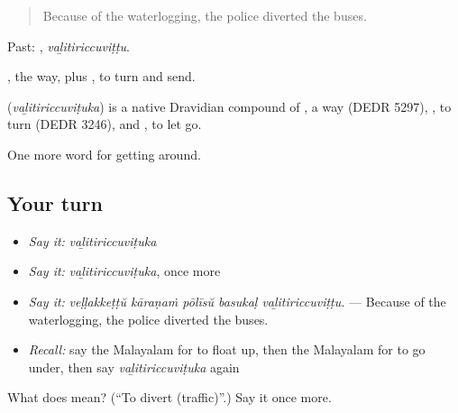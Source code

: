 \begin{quote}
Because of the waterlogging, the police diverted the buses.
\end{quote}

Past: , \emph{vaḻitiriccuviṭṭu}.

, the way, plus , to turn and send.

\begin{cousinweb}
\textbf{} (\emph{vaḻitiriccuviṭuka}) is a native Dravidian compound of , a way (DEDR 5297), , to turn (DEDR 3246), and , to let go.
\end{cousinweb}

\begin{grammarlens}[title={What you've built}]
One more word for getting around.
\end{grammarlens}

\subsection*{Your turn}
\begin{itemize}
\raggedright
  \item \emph{Say it:} \emph{vaḻitiriccuviṭuka}
  \item \emph{Say it:} \emph{vaḻitiriccuviṭuka}, once more
  \item \emph{Say it:} \emph{veḷḷakkeṭṭŭ kāraṇaṁ pōlīsŭ basukaḷ vaḻitiriccuviṭṭu.} — Because of the waterlogging, the police diverted the buses.
  \item \emph{Recall:} say the Malayalam for to float up, then the Malayalam for to go under, then say \emph{vaḻitiriccuviṭuka} again
\end{itemize}

\begin{tcolorbox}[breakable,colback=teal!4,colframe=teal!35!black,title={Before you move on}]
What does  mean? (\textquotedblleft{}To divert (traffic)\textquotedblright{}.) Say it once more.
\end{tcolorbox}

